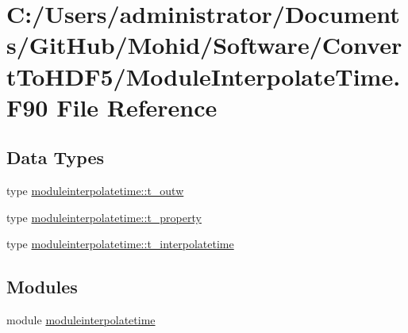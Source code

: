 \hypertarget{_module_interpolate_time_8_f90}{}\section{C\+:/\+Users/administrator/\+Documents/\+Git\+Hub/\+Mohid/\+Software/\+Convert\+To\+H\+D\+F5/\+Module\+Interpolate\+Time.F90 File Reference}
\label{_module_interpolate_time_8_f90}
\subsection*{Data Types}
\begin{DoxyCompactItemize}
\item 
type \mbox{\hyperlink{structmoduleinterpolatetime_1_1t__outw}{moduleinterpolatetime\+::t\+\_\+outw}}
\item 
type \mbox{\hyperlink{structmoduleinterpolatetime_1_1t__property}{moduleinterpolatetime\+::t\+\_\+property}}
\item 
type \mbox{\hyperlink{structmoduleinterpolatetime_1_1t__interpolatetime}{moduleinterpolatetime\+::t\+\_\+interpolatetime}}
\end{DoxyCompactItemize}
\subsection*{Modules}
\begin{DoxyCompactItemize}
\item 
module \mbox{\hyperlink{namespacemoduleinterpolatetime}{moduleinterpolatetime}}
\end{DoxyCompactItemize}
